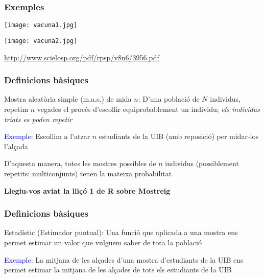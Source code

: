 \documentclass[12pt,t]{beamer}
\newcommand{\blue}[1]{\textcolor{blue}{#1}}
\renewcommand{\emph}[1]{{\color{red}#1}}
\theoremstyle{plain}
\theoremstyle{definition}
\begin{document}
%
%

\begin{frame}
\frametitle{Exemples}


\begin{center}
\texttt{[image: vacuna1.jpg]}\medskip

\texttt{[image: vacuna2.jpg]}
\end{center}


{\footnotesize \url{http://www.scielosp.org/pdf/rpsp/v8n6/3956.pdf}}
\end{frame}

\begin{frame}
\frametitle{Definicions bàsiques}

\emph{Mostra aleatòria simple (m.a.s.) de mida $n$:} D'una població de $N$ individus, repetim $n$ vegades el procés d'escollir equiprobablement un individu; \textit{els individus triats es poden repetir}
\bigskip

\blue{Exemple:} Escollim a l'atzar $n$ estudiants de la UIB (amb reposició) per midar-los l'alçada
\bigskip

D'aquesta manera, totes les mostres possibles de $n$ individus (possiblement repetits: \emph{multiconjunts}) tenen la mateixa probabilitat
\bigskip

\emph{\bf Llegiu-vos aviat la lliçó 1 de R sobre Mostreig}
\end{frame}


\begin{frame}
\frametitle{Definicions bàsiques}

\emph{Estadístic} (\emph{Estimador puntual}): Una funció que aplicada a una mostra ens permet \emph{estimar} un valor que vulguem saber de tota la població
\bigskip

\blue{Exemple:} La mitjana de les alçades d'una mostra d'estudiants de la UIB ens permet estimar la mitjana de les alçades de tots els estudiants de la UIB
\bigskip

\end{frame}
\end{document}

